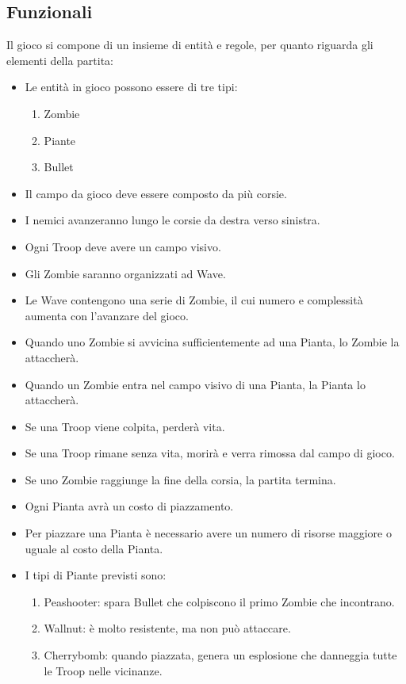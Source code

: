 \subsection{Funzionali}
Il gioco si compone di un insieme di entità e regole, per quanto riguarda gli elementi della partita:
\begin{itemize}
    \item Le entità in gioco possono essere di tre tipi:
    \begin{enumerate}
        \item Zombie
        \item Piante
        \item Bullet
    \end{enumerate}
    \item Il campo da gioco deve essere composto da più corsie.
    \item I nemici avanzeranno lungo le corsie da destra verso sinistra.
    \item Ogni Troop deve avere un campo visivo.
    \item Gli Zombie saranno organizzati ad Wave.
    \item Le Wave contengono una serie di Zombie, il cui numero e complessità aumenta con l'avanzare del gioco.
    \item Quando uno Zombie si avvicina sufficientemente ad una Pianta, lo Zombie la attaccherà.
    \item Quando un Zombie entra nel campo visivo di una Pianta, la Pianta lo attaccherà.
    \item Se una Troop viene colpita, perderà vita.
    \item Se una Troop rimane senza vita, morirà e verra rimossa dal campo di gioco.
    \item Se uno Zombie raggiunge la fine della corsia, la partita termina.
    \item Ogni Pianta avrà un costo di piazzamento.
    \item Per piazzare una Pianta è necessario avere un numero di risorse maggiore o uguale al costo della Pianta. 
    \item I tipi di Piante previsti sono:
    \begin{enumerate}
        \item Peashooter: spara Bullet che colpiscono il primo Zombie che incontrano.
        \item Wallnut: è molto resistente, ma non può attaccare.
        \item Cherrybomb: quando piazzata, genera un esplosione che danneggia tutte le Troop nelle vicinanze.

\end{enumerate}
\end{itemize}
